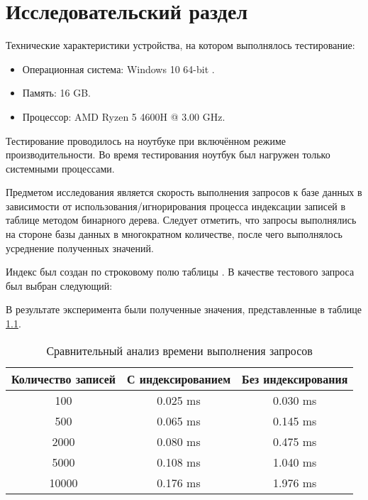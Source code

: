 \chapter{Исследовательский раздел}
\label{cha:research}

Технические характеристики устройства, на котором выполнялось тестирование:

\begin{itemize}
	\item Операционная система: Windows 10 64-bit \cite{windows}.
	\item Память: 16 GB.
	\item Процессор: AMD Ryzen 5 4600H \cite{amd} @ 3.00 GHz.
\end{itemize}

Тестирование проводилось на ноутбуке при включённом режиме производительности. Во время тестирования ноутбук был нагружен только системными процессами.

Предметом исследования является скорость выполнения запросов к базе данных в зависимости от использования/игнорирования процесса индексации записей в таблице методом бинарного дерева. Следует отметить, что запросы выполнялись на стороне базы данных в многократном количестве, после чего выполнялось усреднение полученных значений.

Индекс был создан по строковому полю  таблицы . В качестве тестового запроса был выбран следующий: 


В результате эксперимента были полученные значения, представленные в таблице \ref{tabular:times}.


\begin{table}[h!]
	\centering
	\caption{\label{tabular:times}Сравнительный анализ времени выполнения запросов}
\begin{tabular}{|c|c|c|}
	\hline
	\textbf{Количество записей} & \textbf{С индексированием} & \textbf{Без индексирования} \\ \hline
	100 & 0.025 ms & 0.030 ms \\ \hline
	500 & 0.065 ms & 0.145 ms \\ \hline
	2000 & 0.080 ms & 0.475 ms \\ \hline
	5000 & 0.108 ms & 1.040 ms \\ \hline
	10000 & 0.176 ms & 1.976 ms \\ \hline
\end{tabular}
\end{table}

